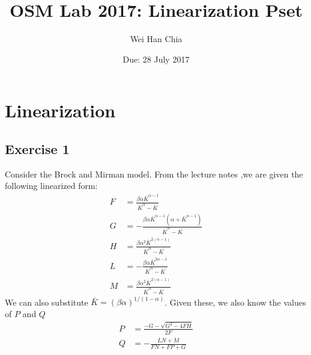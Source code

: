\documentclass{article}
\begin{document}
	\title{OSM Lab 2017: Linearization Pset }
	\author{Wei Han Chia}
	\date{Due: 28 July 2017}
	\maketitle
	
	\section*{Linearization}
	
	\subsection*{Exercise 1}
	Consider the Brock and Mirman model. From the lecture notes ,we are given the following linearized form:
	\begin{align*}
	F &= \frac{\beta \alpha \bar{K}^{\alpha - 1}}{\bar{K}^{\alpha} - \bar{K}} \\
	G &= - \frac{\beta \alpha \bar{K}^{\alpha - 1} (\alpha + \bar{K}^{\alpha -1})}{\bar{K}^{\alpha} - \bar{K}}\\
	H &= \frac{\beta \alpha^2\bar{K}^{2(\alpha -1)}}{\bar{K}^{\alpha} - \bar{K}} \\
	L &= - \frac{\beta \alpha \bar{K}^{2\alpha - 1}}{\bar{K}^{\alpha} - \bar{K}} \\
	M &= \frac{\beta \alpha^2\bar{K}^{2(\alpha -1)}}{\bar{K}^{\alpha} - \bar{K}}		
	\end{align*}
	We can also substitute $\bar{K} = (\beta \alpha)^{1/(1 -\alpha)}$. Given these, we also know the values of $P$ and $Q$
	\begin{align*}
	P &= \frac{-G - \sqrt{G^2 - 4FH}}{2F}\\
	Q &= - \frac{LN+ M}{FN + FP + G}
	\end{align*}
\end{document}
